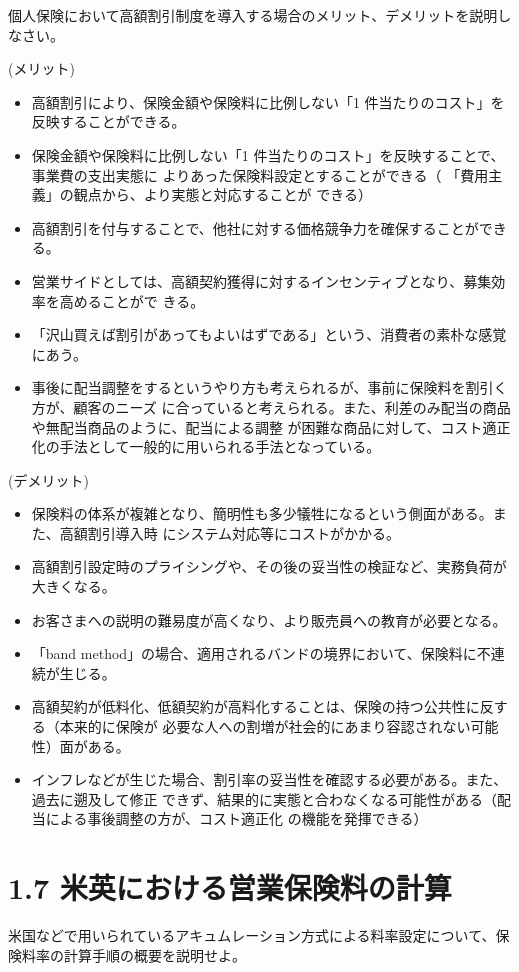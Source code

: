\documentclass[report,gutter=10mm,fore-edge=10mm,uplatex,dvipdfmx]{jlreq}
\begin{document}
個人保険において高額割引制度を導入する場合のメリット、デメリットを説明しなさい。


(メリット)
\begin{itemize}
 \item 高額割引により、保険金額や保険料に比例しない「1 件当たりのコスト」を反映することができる。
 \item 保険金額や保険料に比例しない「1 件当たりのコスト」を反映することで、事業費の支出実態に
よりあった保険料設定とすることができる（
「費用主義」の観点から、より実態と対応することが
できる）
 \item 高額割引を付与することで、他社に対する価格競争力を確保することができる。
 \item 営業サイドとしては、高額契約獲得に対するインセンティブとなり、募集効率を高めることがで
きる。
 \item 「沢山買えば割引があってもよいはずである」という、消費者の素朴な感覚にあう。
 \item 事後に配当調整をするというやり方も考えられるが、事前に保険料を割引く方が、顧客のニーズ
に合っていると考えられる。また、利差のみ配当の商品や無配当商品のように、配当による調整
が困難な商品に対して、コスト適正化の手法として一般的に用いられる手法となっている。
\end{itemize}

(デメリット)
\begin{itemize}
 \item 保険料の体系が複雑となり、簡明性も多少犠牲になるという側面がある。また、高額割引導入時
にシステム対応等にコストがかかる。
 \item 高額割引設定時のプライシングや、その後の妥当性の検証など、実務負荷が大きくなる。
 \item お客さまへの説明の難易度が高くなり、より販売員への教育が必要となる。
 \item 
「band method」の場合、適用されるバンドの境界において、保険料に不連続が生じる。
 \item 高額契約が低料化、低額契約が高料化することは、保険の持つ公共性に反する（本来的に保険が
必要な人への割増が社会的にあまり容認されない可能性）面がある。
 \item インフレなどが生じた場合、割引率の妥当性を確認する必要がある。また、過去に遡及して修正
できず、結果的に実態と合わなくなる可能性がある（配当による事後調整の方が、コスト適正化
の機能を発揮できる）
\end{itemize}

\section{1.7 米英における営業保険料の計算}
米国などで用いられているアキュムレーション方式による料率設定について、保険料率の計算手順の概要を説明せよ。
\end{document}
